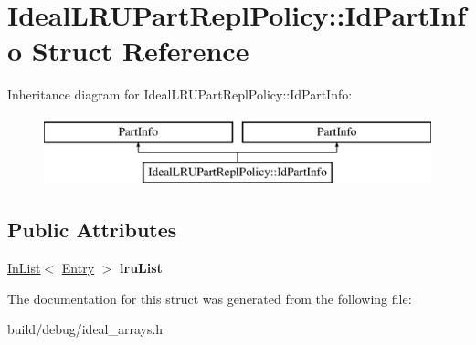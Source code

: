 \hypertarget{structIdealLRUPartReplPolicy_1_1IdPartInfo}{\section{Ideal\-L\-R\-U\-Part\-Repl\-Policy\-:\-:Id\-Part\-Info Struct Reference}
\label{structIdealLRUPartReplPolicy_1_1IdPartInfo}
}
Inheritance diagram for Ideal\-L\-R\-U\-Part\-Repl\-Policy\-:\-:Id\-Part\-Info\-:\begin{figure}[H]
\begin{center}
\leavevmode
\includegraphics[height=2.000000cm]{structIdealLRUPartReplPolicy_1_1IdPartInfo}
\end{center}
\end{figure}
\subsection*{Public Attributes}
\begin{DoxyCompactItemize}
\item 
\hypertarget{structIdealLRUPartReplPolicy_1_1IdPartInfo_ab54b38b103657822a18d6b9bede81a39}{\hyperlink{classInList}{In\-List}$<$ \hyperlink{structIdealLRUPartReplPolicy_1_1Entry}{Entry} $>$ {\bfseries lru\-List}}\label{structIdealLRUPartReplPolicy_1_1IdPartInfo_ab54b38b103657822a18d6b9bede81a39}

\end{DoxyCompactItemize}


The documentation for this struct was generated from the following file\-:\begin{DoxyCompactItemize}
\item 
build/debug/ideal\-\_\-arrays.\-h\end{DoxyCompactItemize}
